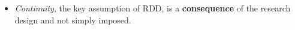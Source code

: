 \begin{frame}

\begin{figure}[htp]\centering
{}
\end{figure}

\end{frame}
\begin{frame}

\begin{itemize}
\item \textit{Continuity}, the key assumption of RDD, is a \textbf{consequence} of the research design and not simply imposed.

\end{itemize}

\end{frame}
